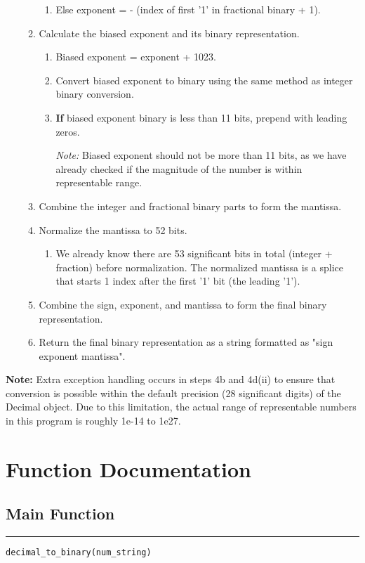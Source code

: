 \documentclass[12pt]{article}
\begin{document}
\begin{enumerate}
\begin{enumerate}
\begin{enumerate}
            \item Else exponent = - (index of first '1' in fractional binary + 1).
        \end{enumerate}
        \item Calculate the biased exponent and its binary representation. 
        \begin{enumerate}
            \item Biased exponent = exponent + 1023.
            \item Convert biased exponent to binary using the same method as integer binary conversion.
            \item \textbf{If} biased exponent binary is less than 11 bits, prepend with leading zeros.
            
            \emph{Note:} Biased exponent should not be more than 11 bits, as we have already checked if the magnitude of the number is within representable range.
        \end{enumerate}
        \item Combine the integer and fractional binary parts to form the mantissa.
        \item Normalize the mantissa to 52 bits.
        \begin{enumerate}
            \item We already know there are 53 significant bits in total (integer + fraction) before normalization. The normalized mantissa is a splice that starts 1 index after the first '1' bit (the leading '1').
        \end{enumerate}
        \item Combine the sign, exponent, and mantissa to form the final binary representation.
        \item Return the final binary representation as a string formatted as "sign exponent mantissa".
    \end{enumerate}
\end{enumerate}
\textbf{Note:} Extra exception handling occurs in steps 4b and 4d(ii) to ensure that conversion is possible within the default precision (28 significant digits) of the Decimal object. Due to this limitation, the actual range of representable numbers in this program is roughly 1e-14 to 1e27.

\section*{Function Documentation}
\subsection*{Main Function\\} 
\hrule
{\large\texttt{decimal\_to\_binary(num\_string)}}
\end{document}
